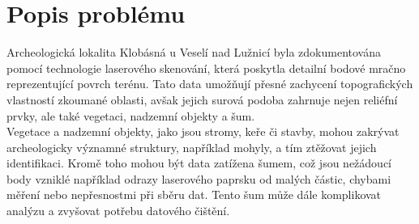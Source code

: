 \section{Popis problému}
Archeologická lokalita Klobásná u Veselí nad Lužnicí byla zdokumentována pomocí technologie laserového skenování, která poskytla detailní bodové mračno reprezentující povrch terénu. Tato data umožňují přesné zachycení topografických vlastností zkoumané oblasti, avšak jejich surová podoba zahrnuje nejen reliéfní prvky, ale také vegetaci, nadzemní objekty a šum.
\\
Vegetace a nadzemní objekty, jako jsou stromy, keře či stavby, mohou zakrývat archeologicky významné struktury, například mohyly, a tím ztěžovat jejich identifikaci. Kromě toho mohou být data zatížena šumem, což jsou nežádoucí body vzniklé například odrazy laserového paprsku od malých částic, chybami měření nebo nepřesnostmi při sběru dat. Tento šum může dále komplikovat analýzu a zvyšovat potřebu datového čištění.
